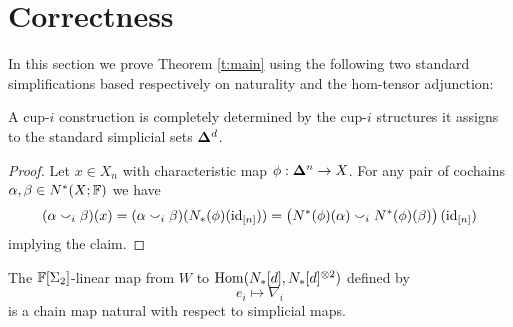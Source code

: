 
\section{Correctness} 

In this section we prove Theorem \ref{t:main} using the following two standard simplifications based respectively on naturality and the hom-tensor adjunction:
\begin{lemma}
	A cup-$i$ construction is completely determined by the cup-$i$ structures it assigns to the standard simplicial sets $\bm{\Delta}^d$.
\end{lemma} 

\begin{proof}
	Let $x \in X_{n}$ with characteristic map $\phi : \bm{\Delta}^{n} \to X$. For any pair of cochains $\alpha, \beta \in N^*(X; \mathbb{F})$ we have
	\begin{equation*}
	(\alpha \smallsmile_{i} \beta)(x) = (\alpha \smallsmile_{i} \beta)(N_*(\phi)(\mathrm{id}_{[n]})) = \big( N^*(\phi)(\alpha) \smallsmile_{i} N^*(\phi)(\beta) \big) \,(\mathrm{id}_{[n]})
	\end{equation*}
	implying the claim.
\end{proof}

\begin{proposition} \label{proposition1: existence}
	The $\mathbb{F}[\Sigma_2]$-linear map from $W$ to $\mathrm{Hom}(N_*[d], N_*[d]^{\otimes 2})$ defined by
	\begin{equation*}
	e_i \mapsto \nabla_i
	\end{equation*}
	is a chain map natural with respect to simplicial maps.
\end{proposition}

